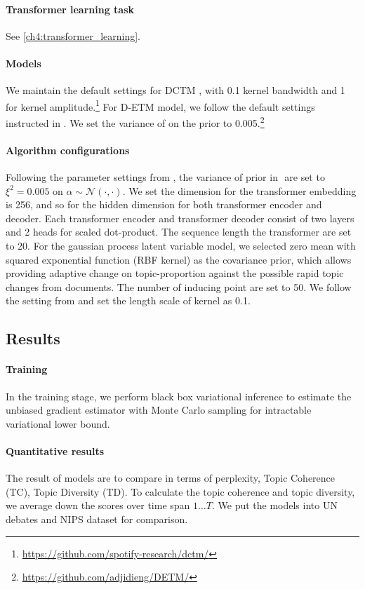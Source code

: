 \paragraph{Transformer learning task} See \ref{ch4:transformer_learning}.
\paragraph{Models}
We maintain the default settings for DCTM \cite{tomasi_stochastic_nodate}, with 0.1 kernel bandwidth and 1 for kernel amplitude.\footnote{\url{https://github.com/spotify-research/dctm/}}
For D-ETM model, we follow the default settings instructed in \cite{dieng_dynamic_2019}. We set the variance of  on the prior to 0.005.\footnote{\url{https://github.com/adjidieng/DETM/}}
\paragraph{Algorithm configurations}
Following the parameter settings from \cite{blei_dynamic_2006}, the variance of prior in $  $ are set to $ \xi^2=0.005 $ on $ \alpha\sim\mathcal{N}(\cdot,\cdot) $.
We set the dimension for the transformer embedding is 256, and so for the hidden dimension for both transformer encoder and decoder. Each transformer encoder and transformer decoder consist of two layers and 2 heads for scaled dot-product. The sequence length the transformer are set to 20.
For the gaussian process latent variable model, we selected zero mean with squared exponential function (RBF kernel) as the covariance prior, which allows providing adaptive change on topic-proportion against the possible rapid topic changes from documents. The number of inducing point are set to 50. We follow the setting from \cite{tomasi_stochastic_nodate} and set the length scale of kernel as 0.1.
\subsection{Results}
\paragraph{Training}
In the training stage, we perform black box variational inference to estimate the unbiased gradient estimator with Monte Carlo sampling for intractable variational lower bound.
\paragraph{Quantitative results}
The result of models are to compare in terms of perplexity, Topic Coherence (TC), Topic Diversity (TD). To calculate the topic coherence and topic diversity, we average down the scores over time span $ 1\dots T $. We put the models into UN debates and NIPS dataset for comparison.

